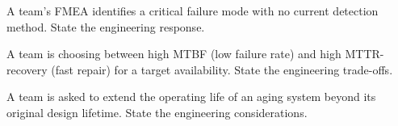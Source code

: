 \begin{exercise}
A team's FMEA identifies a critical failure mode with no current detection method. State the engineering response.
\end{exercise}

\begin{exercise}
A team is choosing between high MTBF (low failure rate) and high MTTR-recovery (fast repair) for a target availability. State the engineering trade-offs.
\end{exercise}

\begin{exercise}
A team is asked to extend the operating life of an aging system beyond its original design lifetime. State the engineering considerations.
\end{exercise}
